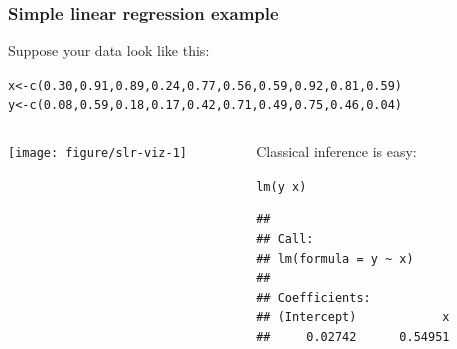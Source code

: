 \documentclass[color=usenames,dvipsnames]{beamer}\usepackage[]{graphicx}\usepackage[]{color}
\makeatletter
\newcommand{\hlnum}[1]{\textcolor[rgb]{0.69,0.494,0}{#1}}%
\newcommand{\hlopt}[1]{\textcolor[rgb]{0,0,0}{#1}}%
\newcommand{\hlstd}[1]{\textcolor[rgb]{0,0,0}{#1}}%
\newcommand{\hlkwb}[1]{\textcolor[rgb]{0,0.341,0.682}{#1}}%
\newcommand{\hlkwd}[1]{\textcolor[rgb]{0.004,0.004,0.506}{#1}}%
\newenvironment{kframe}{%
 \def\at@end@of@kframe{}%
 \ifinner\ifhmode%
  \def\at@end@of@kframe{\end{minipage}}%
  \begin{minipage}{\columnwidth}%
 \fi\fi%
 \def\FrameCommand##1{\hskip\@totalleftmargin \hskip-\fboxsep
 \colorbox{shadecolor}{##1}\hskip-\fboxsep
     \hskip-\linewidth \hskip-\@totalleftmargin \hskip\columnwidth}%
 \MakeFramed {\advance\hsize-\width
   \@totalleftmargin\z@ \linewidth\hsize
   \@setminipage}}%
 {\par\unskip\endMakeFramed%
 \at@end@of@kframe}
\newenvironment{knitrout}{}{} %
\makeatother
\begin{document}
\begin{frame}[fragile]
  \frametitle{Simple linear regression example}
  Suppose your data look like this:
\begin{knitrout}\scriptsize
{}\color{fgcolor}\begin{kframe}
\begin{alltt}
\hlstd{x} \hlkwb{<-} \hlkwd{c}\hlstd{(}\hlnum{0.30}\hlstd{,} \hlnum{0.91}\hlstd{,} \hlnum{0.89}\hlstd{,} \hlnum{0.24}\hlstd{,} \hlnum{0.77}\hlstd{,} \hlnum{0.56}\hlstd{,} \hlnum{0.59}\hlstd{,} \hlnum{0.92}\hlstd{,} \hlnum{0.81}\hlstd{,} \hlnum{0.59}\hlstd{)}
\hlstd{y} \hlkwb{<-} \hlkwd{c}\hlstd{(}\hlnum{0.08}\hlstd{,} \hlnum{0.59}\hlstd{,} \hlnum{0.18}\hlstd{,} \hlnum{0.17}\hlstd{,} \hlnum{0.42}\hlstd{,} \hlnum{0.71}\hlstd{,} \hlnum{0.49}\hlstd{,} \hlnum{0.75}\hlstd{,} \hlnum{0.46}\hlstd{,} \hlnum{0.04}\hlstd{)}
\end{alltt}
\end{kframe}
\end{knitrout}
\begin{columns}
  \begin{column}{0.5\textwidth}
\begin{knitrout}
\color{fgcolor}
\texttt{[image: figure/slr-viz-1]} 
\end{knitrout}
  \end{column}
  \pause
  \begin{column}{0.5\textwidth}
    Classical inference is easy:
\begin{knitrout}\scriptsize
{}\color{fgcolor}\begin{kframe}
\begin{alltt}
\hlkwd{lm}\hlstd{(y}\hlopt{~}\hlstd{x)}
\end{alltt}
\begin{verbatim}
## 
## Call:
## lm(formula = y ~ x)
## 
## Coefficients:
## (Intercept)            x  
##     0.02742      0.54951
\end{verbatim}
\end{kframe}
\end{knitrout}
  \end{column}
\end{columns}
\end{frame}
\end{document}
